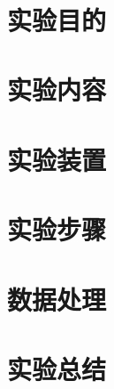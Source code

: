 \documentclass{article}
\title{\textbf{}}
\author{}
\date{}
\begin{document}
\maketitle

\section{实验目的}


\section{实验内容}


\section{实验装置}


\section{实验步骤}


\section{数据处理}


\section{实验总结}
\end{document}
